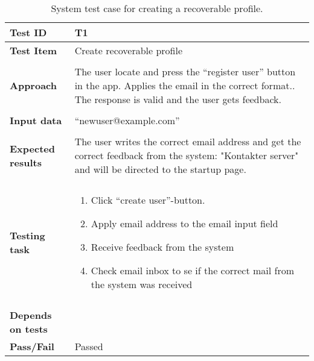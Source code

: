 \begin{table}[H]
	\centering
	\caption{System test case for creating a recoverable profile.}
	\begin{adjustbox}{center}
	\begin{tabular}[b]{ | l | l  |}
		\hline
		\textbf{Test ID} & T1  \\ \hline
		\textbf{Test Item} & Create recoverable profile \\ \hline&\\[-2ex]
		\textbf{Approach} & \begin{minipage}{5in}The user locate and press the “register user” button in the app. Applies the email in the correct format.. The response is valid and the user gets feedback. \end{minipage}\\ &\\[-2ex]\hline
		\textbf{Input data} &  “newuser@example.com”\\ \hline&\\[-2ex]
		
		\textbf{Expected results} & \begin{minipage}{5in}The user writes the correct email address and get the correct feedback from the system: "Kontakter server" and will be directed to the startup page.\end{minipage}\\ \hline&\\[-2ex]
		
		\textbf{Testing task} & \begin{minipage}{5in}
			\begin{enumerate}[noitemsep]
				\item Click  “create user”-button.
				\item Apply email address to the email input field 
				\item Receive feedback from the system
				\item Check email inbox to se if the correct mail from the system was received 
			\end{enumerate} \end{minipage}
			\\&\\[-2ex] \hline
			\textbf{Depends on tests}& \\ \hline	
			\textbf{Pass/Fail} & Passed \\\hline				
		\end{tabular}
		\end{adjustbox}
		\label{Tab:systemtest1}
	\end{table}
			
